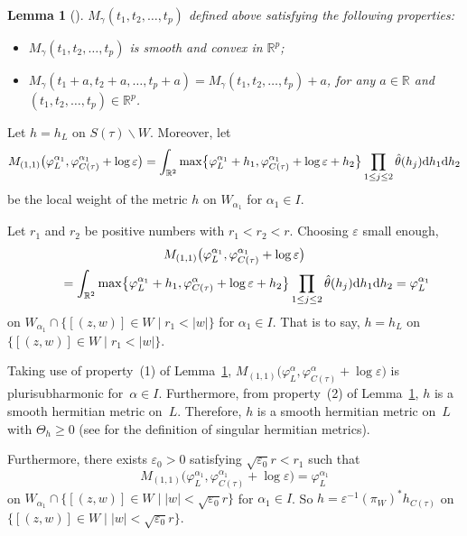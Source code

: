 \documentclass[10pt,a4paper]{amsart}
\numberwithin{equation}{section}
\newtheorem{Lemma}[Theorem]{Lemma}
\begin{document}
\begin{Lemma}[{\cite[Lemma~5.18]{Jean}}] \label{Lemma3.18}
 $M_\gamma (t_1,t_2,\dots ,t_p)$ defined above satisfying the following properties:
\begin{itemize}\itemsep=0pt
\item[$(1)$]$M_\gamma (t_1,t_2,\dots ,t_p)$ is smooth and convex in $\mathbb{R}^p$;
\item[$(2)$]$M_\gamma (t_1+a,t_2+a,\dots ,t_p+a)=M_\gamma (t_1,t_2,\dots ,t_p)+a$, for any $a \in \mathbb{R}$ and $(t_1,t_2,\dots ,t_p) \in \mathbb{R}^p$.
\end{itemize}
\end{Lemma}

Let $h=h_L$ on $S(\tau)\backslash W$. Moreover, let
\[
M_{(1,1)}\bigl(\varphi^{\alpha_1}_L,\varphi^{\alpha_1}_{C(\tau)}+\log\varepsilon\bigr)=\int_{\mathbb{R}^2}\max\bigl\{\varphi^{\alpha_1}_L+h_1,\varphi^{\alpha_1}_{C(\tau)}
+\log\varepsilon+h_2 \bigr\}\prod_{1\leq j\leq 2}\hat{\theta}(h_j){\rm d}h_1{\rm d}h_2\]
be the local weight of the metric $h$ on $W_{\alpha_1}$ for $\alpha_1 \in I$.

Let $r_1$ and $r_2$ be positive numbers with $r_1 <r_2<r$. Choosing $\varepsilon$ small enough,
\begin{gather*}
M_{(1,1)}\bigl(\varphi^{\alpha_1}_L,\varphi^{\alpha_1}_{C(\tau)}+\log \varepsilon\bigr)\\
\qquad=\int_{\mathbb{R}^2}\max \bigl\{\varphi^{\alpha_1}_L+h_1,\varphi^\alpha_{C(\tau)}+\log\varepsilon +h_2 \bigr\} \prod_{1 \leq j \leq 2} \hat{\theta} (h_j){\rm d} h_1 {\rm d} h_2 =\varphi^{\alpha_1}_L
\end{gather*}
on $W_{\alpha_1} \cap \{ [(z,w)] \in W \mid r_1 <|w| \}$ for $\alpha_1 \in I$. That is to say, $h=h_L$ on $ \{ [(z,w)] \in W \mid r_1<|w| \}$.

Taking use of property~(1) of Lemma~\ref{Lemma3.18}, $M_{(1,1)}\bigl(\varphi^\alpha_L,\varphi^\alpha_{C(\tau)}+\log \varepsilon\bigr)$ is plurisubharmonic for~${\alpha\in I}$. Furthermore, from property~(2) of Lemma~\ref{Lemma3.18}, $h$ is a smooth hermitian metric on~$L$. Therefore, $h$ is a smooth hermitian metric on~$L$ with $\Theta_{h}\geq 0 $ (see \cite[Section~8.2]{Vincent-Ahmed} for the definition of singular hermitian metrics).

Furthermore, there exists $\varepsilon_0 >0$ satisfying $\sqrt{\varepsilon_0}r<r_1$ such that
\[
M_{(1,1)}\bigl(\varphi^{\alpha_1}_L,\varphi^{\alpha_1}_{C(\tau)}+\log \varepsilon\bigr)=\varphi^{\alpha_1}_L
\]
on $W_{\alpha_1} \cap \{ [(z,w)] \in W\mid |w|< \sqrt{\varepsilon_0}r \}$ for $\alpha_1 \in I$. So
$h=\varepsilon^{-1}(\pi_W)^*h_{C(\tau)}$ on $\{ [(z,w)] \in W \mid |w|< \sqrt{\varepsilon_0} r \}$.
\end{document}
